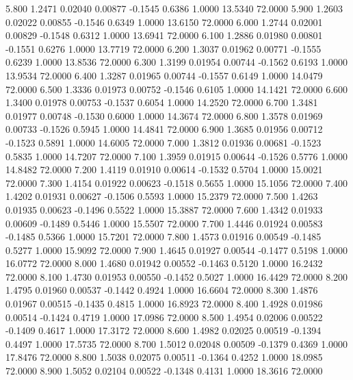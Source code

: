    5.800   1.2471   0.02040   0.00877  -0.1545   0.6386   1.0000  13.5340  72.0000
   5.900   1.2603   0.02022   0.00855  -0.1546   0.6349   1.0000  13.6150  72.0000
   6.000   1.2744   0.02001   0.00829  -0.1548   0.6312   1.0000  13.6941  72.0000
   6.100   1.2886   0.01980   0.00801  -0.1551   0.6276   1.0000  13.7719  72.0000
   6.200   1.3037   0.01962   0.00771  -0.1555   0.6239   1.0000  13.8536  72.0000
   6.300   1.3199   0.01954   0.00744  -0.1562   0.6193   1.0000  13.9534  72.0000
   6.400   1.3287   0.01965   0.00744  -0.1557   0.6149   1.0000  14.0479  72.0000
   6.500   1.3336   0.01973   0.00752  -0.1546   0.6105   1.0000  14.1421  72.0000
   6.600   1.3400   0.01978   0.00753  -0.1537   0.6054   1.0000  14.2520  72.0000
   6.700   1.3481   0.01977   0.00748  -0.1530   0.6000   1.0000  14.3674  72.0000
   6.800   1.3578   0.01969   0.00733  -0.1526   0.5945   1.0000  14.4841  72.0000
   6.900   1.3685   0.01956   0.00712  -0.1523   0.5891   1.0000  14.6005  72.0000
   7.000   1.3812   0.01936   0.00681  -0.1523   0.5835   1.0000  14.7207  72.0000
   7.100   1.3959   0.01915   0.00644  -0.1526   0.5776   1.0000  14.8482  72.0000
   7.200   1.4119   0.01910   0.00614  -0.1532   0.5704   1.0000  15.0021  72.0000
   7.300   1.4154   0.01922   0.00623  -0.1518   0.5655   1.0000  15.1056  72.0000
   7.400   1.4202   0.01931   0.00627  -0.1506   0.5593   1.0000  15.2379  72.0000
   7.500   1.4263   0.01935   0.00623  -0.1496   0.5522   1.0000  15.3887  72.0000
   7.600   1.4342   0.01933   0.00609  -0.1489   0.5446   1.0000  15.5507  72.0000
   7.700   1.4446   0.01924   0.00583  -0.1485   0.5366   1.0000  15.7201  72.0000
   7.800   1.4573   0.01916   0.00549  -0.1485   0.5277   1.0000  15.9092  72.0000
   7.900   1.4645   0.01927   0.00544  -0.1477   0.5198   1.0000  16.0772  72.0000
   8.000   1.4680   0.01942   0.00552  -0.1463   0.5120   1.0000  16.2432  72.0000
   8.100   1.4730   0.01953   0.00550  -0.1452   0.5027   1.0000  16.4429  72.0000
   8.200   1.4795   0.01960   0.00537  -0.1442   0.4924   1.0000  16.6604  72.0000
   8.300   1.4876   0.01967   0.00515  -0.1435   0.4815   1.0000  16.8923  72.0000
   8.400   1.4928   0.01986   0.00514  -0.1424   0.4719   1.0000  17.0986  72.0000
   8.500   1.4954   0.02006   0.00522  -0.1409   0.4617   1.0000  17.3172  72.0000
   8.600   1.4982   0.02025   0.00519  -0.1394   0.4497   1.0000  17.5735  72.0000
   8.700   1.5012   0.02048   0.00509  -0.1379   0.4369   1.0000  17.8476  72.0000
   8.800   1.5038   0.02075   0.00511  -0.1364   0.4252   1.0000  18.0985  72.0000
   8.900   1.5052   0.02104   0.00522  -0.1348   0.4131   1.0000  18.3616  72.0000
